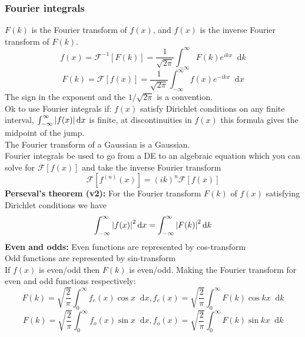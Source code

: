 \documentclass[a4paper, 10pt]{article}
\newcommand*\diff{\mathop{}\!\mathrm{d}}
\begin{document}
\begin{multicols*}{3}
\subsubsection*{\small Fourier integrals}
$F(k)$ is the Fourier transform of $f(x)$, and $f(x)$ is the inverse Fourier transform of $F(k)$.
$$ f(x) = \mathcal{F}^{-1}\left[ F(k) \right] = \frac{1}{\sqrt{2\pi}} \int_{-\infty}^{\infty} F(k) e^{ikx} \diff k $$
$$ F(k) = \mathcal{F}\left[ f(x) \right] = \frac{1}{\sqrt{2\pi}} \int_{-\infty}^{\infty} f(x) e^{-ik x} \diff x$$
The sign in the exponent and the $1/\sqrt{2\pi}$ is a convention.\\
Ok to use Fourier integrals if: $f(x)$ satisfy Dirichlet conditions on any finite interval, $\int_{-\infty}^{\infty} \abs{f(x)} \diff x$ is finite, at discontinuities in $f(x)$ this formula gives the midpoint of the jump.\\
The Fourier transform of a Gaussian is a Gaussian.\\
Fourier integrals be used to go from a DE to an algebraic equation which you can solve for $\mathcal{F}\left[ f(x) \right]$ and take the inverse Fourier transform
$$ \mathcal{F}\left[ f^{(n)}(x) \right] = (ik)^n\mathcal{F}\left[ f(x) \right]$$
\textbf{Perseval's theorem (v2):}
For the Fourier transform $F(k)$ of $f(x)$ satisfying Dirichlet conditions we have
$$\int_{-\infty}^{\infty} \abs{f(x)}^2 \diff x = \int_{-\infty}^{\infty} \abs{F(k)}^2 \diff k $$
\textbf{Even and odds:}
Even functions are represented by cos-transform\\
Odd  functions are represented by sin-transform\\
If $f(x)$ is even/odd then $F(k)$ is even/odd. Making the Fourier transform for even and odd functions respectively:
$$F(k) = \sqrt{\frac{2}{\pi}}\int_0^\infty f_e(x) \cos{x}\diff x, f_e(x) = \sqrt{\frac{2}{\pi}} \int_0^\infty F(k)\cos{kx} \diff k$$
$$F(k) = \sqrt{\frac{2}{\pi}}\int_0^\infty f_o(x) \sin{x}\diff x, f_o(x) = \sqrt{\frac{2}{\pi}} \int_0^\infty F(k)\sin{kx} \diff k$$

\begin{mdframed}

\end{mdframed}
\end{multicols*}
\end{document}
